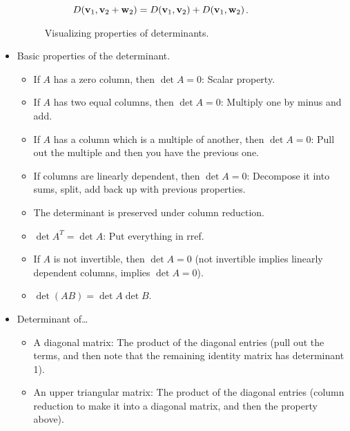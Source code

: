 \documentclass[../../notes.tex]{subfiles}
\begin{document}
\begin{itemize}
\begin{figure}[h!]
\begin{subfigure}[b]{0.45\linewidth}
            \caption{$D(\mathbf{v}_1,\mathbf{v}_2+\mathbf{w}_2)=D(\mathbf{v}_1,\mathbf{v}_2)+D(\mathbf{v}_1,\mathbf{w}_2)$.}
            \label{fig:determinantPropertiesb}
        \end{subfigure}
        \caption{Visualizing properties of determinants.}
        \label{fig:determinantProperties}
    \end{figure}
    \item Basic properties of the determinant.
    \begin{itemize}
        \item If $A$ has a zero column, then $\det A=0$: Scalar property.
        \item If $A$ has two equal columns, then $\det A=0$: Multiply one by minus and add.
        \item If $A$ has a column which is a multiple of another, then $\det A=0$: Pull out the multiple and then you have the previous one.
        \item If columns are linearly dependent, then $\det A=0$: Decompose it into sums, split, add back up with previous properties.
        \item The determinant is preserved under column reduction.
        \item $\det A^T=\det A$: Put everything in rref.
        \item If $A$ is not invertible, then $\det A=0$ (not invertible implies linearly dependent columns, implies $\det A=0$).
        \item $\det(AB)=\det A\det B$.
    \end{itemize}
    \item Determinant of\dots
    \begin{itemize}
        \item A diagonal matrix: The product of the diagonal entries (pull out the terms, and then note that the remaining identity matrix has determinant 1).
        \item An upper triangular matrix: The product of the diagonal entries (column reduction to make it into a diagonal matrix, and then the property above).
    \end{itemize}
\end{itemize}
\end{document}
